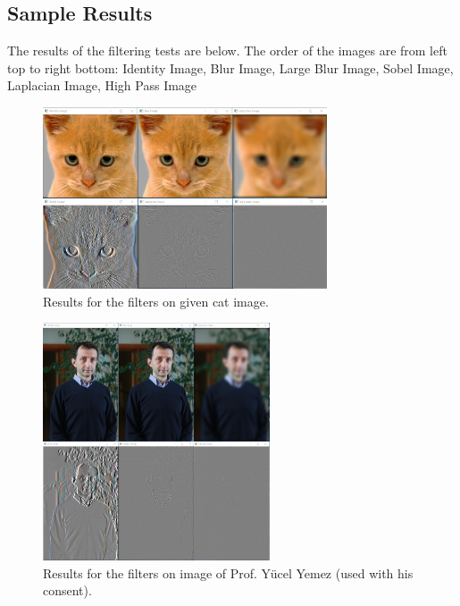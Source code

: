 \documentclass{article}
\begin{document}
\newpage

\subsection{Sample Results}
The results of the filtering tests are below. The order of the images are from left top to right bottom: Identity Image, Blur Image, Large Blur Image, Sobel Image, Laplacian Image, High Pass Image
\begin{figure}[!htb]
\centering
\includegraphics[width=0.75\textwidth]{cat_filtering_results.png}
\caption{Results for the filters on given cat image.}
\end{figure}


\begin{figure}[!htb]
\centering
\includegraphics[width=0.6\textwidth]{yyemez_filtering_results.png}
\caption{Results for the filters on image of Prof. Y\"ucel Yemez (used with his consent).}
\end{figure}

\end{document}
